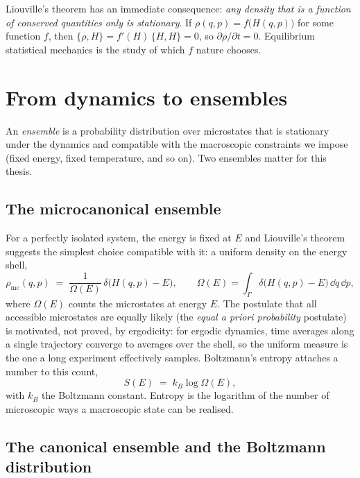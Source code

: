 Liouville's theorem has an immediate consequence: \emph{any density that
is a function of conserved quantities only is stationary}. If
$\rho(q,p) = f\big(H(q,p)\big)$ for some function $f$, then
$\{\rho, H\} = f'(H)\,\{H, H\} = 0$, so $\partial \rho / \partial t = 0$.
Equilibrium statistical mechanics is the study of which $f$ nature
chooses.

\section{From dynamics to ensembles}\label{sec:ensembles}

An \emph{ensemble} is a probability distribution over microstates that is
stationary under the dynamics and compatible with the macroscopic
constraints we impose (fixed energy, fixed temperature, and so on). Two
ensembles matter for this thesis.

\subsection{The microcanonical ensemble}

For a perfectly isolated system, the energy is fixed at $E$ and
Liouville's theorem suggests the simplest choice compatible with it: a
uniform density on the energy shell,
\begin{equation}
  \rho_{\mathrm{mc}}(q, p)
  \;=\; \frac{1}{\Omega(E)}\,
        \delta\big(H(q,p) - E\big),
  \qquad
  \Omega(E) = \int_\Gamma \delta\big(H(q,p) - E\big)\,\dd q\,\dd p ,
  \label{eq:microcanonical}
\end{equation}
where $\Omega(E)$ counts the microstates at energy $E$. The postulate
that all accessible microstates are equally likely (the \emph{equal a
priori probability} postulate) is motivated, not proved, by ergodicity:
for ergodic dynamics, time averages along a single trajectory converge to
averages over the shell, so the uniform measure is the one a long
experiment effectively samples. Boltzmann's entropy attaches a number to
this count,
\begin{equation}
  S(E) \;=\; k_B \log \Omega(E),
  \label{eq:boltzmann-entropy}
\end{equation}
with $k_B$ the Boltzmann constant. Entropy is the logarithm of the number
of microscopic ways a macroscopic state can be realised.

\subsection{The canonical ensemble and the Boltzmann distribution}
\label{sec:canonical}

